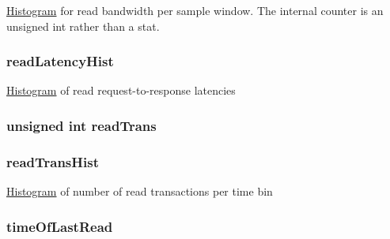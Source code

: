 \label{structCommMonitor_1_1MonitorStats_a7229cb3b887686f75714605936a6c0f0}
\hyperlink{classHistogram}{Histogram} for read bandwidth per sample window. The internal counter is an unsigned int rather than a stat. \hypertarget{structCommMonitor_1_1MonitorStats_ac0d798255fcda6961d92d727c4f561e9}{
\subsubsection[{readLatencyHist}]{ {\bf readLatencyHist}}}
\label{structCommMonitor_1_1MonitorStats_ac0d798255fcda6961d92d727c4f561e9}
\hyperlink{classHistogram}{Histogram} of read request-\/to-\/response latencies \hypertarget{structCommMonitor_1_1MonitorStats_a1f0c5ba2e762ffa5a72d2377150ec73c}{
\subsubsection[{readTrans}]{\setlength{\rightskip}{0pt plus 5cm}unsigned int {\bf readTrans}}}
\label{structCommMonitor_1_1MonitorStats_a1f0c5ba2e762ffa5a72d2377150ec73c}
\hypertarget{structCommMonitor_1_1MonitorStats_a40c4a13f526893ea4f8d068378ce22a0}{
\subsubsection[{readTransHist}]{ {\bf readTransHist}}}
\label{structCommMonitor_1_1MonitorStats_a40c4a13f526893ea4f8d068378ce22a0}
\hyperlink{classHistogram}{Histogram} of number of read transactions per time bin \hypertarget{structCommMonitor_1_1MonitorStats_a6a581354c5e19eb4e16589d9806fef66}{
\subsubsection[{timeOfLastRead}]{ {\bf timeOfLastRead}}}
